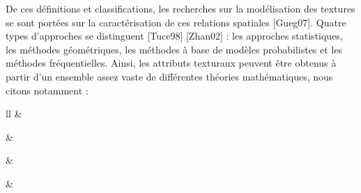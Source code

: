 De ces définitions et classifications, les recherches sur la modélisation des textures se sont portées sur la caractérisation de ces relations spatiales [Gueg07]. Quatre types d’approches se distinguent [Tuce98] [Zhan02] : 
les approches statistiques, les méthodes géométriques, les méthodes à base de modèles probabilistes et les méthodes fréquentielles. Ainsi, les attributs texturaux peuvent être obtenus à partir d’un ensemble assez vaste de différentes théories mathématiques, nous citons notamment :

\begin{table}[H]
	\begin{center}
		\caption{Classification des méthodes d’extraction de texture.}
		\begin{tabular}{ll}
			\hline
			 &   \\                             \hline 
			
			      &   \\ \hline
			
			    &   \\ \hline
			
			    &   	\\ \hline
			
		\end{tabular}
		
	\end{center}
\end{table}



